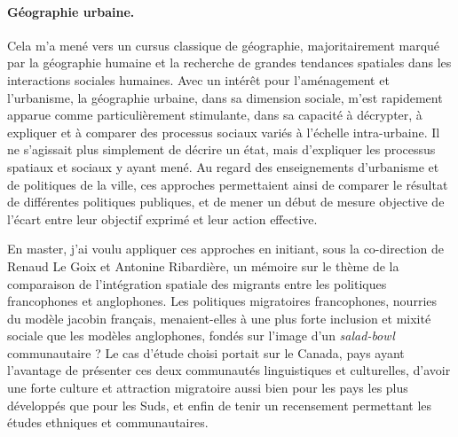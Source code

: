 \paragraph{Géographie urbaine.}
Cela m'a mené vers un cursus classique de géographie, majoritairement marqué par la géographie humaine et la recherche de grandes tendances spatiales dans les interactions sociales humaines.
Avec un intérêt pour l'aménagement et l'urbanisme, la géographie urbaine, dans sa dimension sociale, m'est rapidement apparue comme particulièrement stimulante, dans sa capacité à décrypter, à expliquer et à comparer des processus sociaux variés à l'échelle intra-urbaine.
Il ne s'agissait plus simplement de décrire un état, mais d'expliquer les processus spatiaux et sociaux y ayant mené.
Au regard des enseignements d'urbanisme et de politiques de la ville, ces approches permettaient ainsi de comparer le résultat de différentes politiques publiques, et de mener un début de mesure objective de l'écart entre leur objectif exprimé et leur action effective.

En master, j'ai voulu appliquer ces approches en initiant, sous la co-direction de Renaud Le Goix et Antonine Ribardière, un mémoire sur le thème de la comparaison de l'intégration spatiale des migrants entre les politiques francophones et anglophones.
Les politiques migratoires francophones, nourries du modèle jacobin français, menaient-elles à une plus forte inclusion et mixité sociale que les modèles anglophones, fondés sur l'image d'un \og \textit{salad-bowl}\fg{} communautaire ?
Le cas d'étude choisi portait sur le Canada, pays ayant l'avantage de présenter ces deux communautés linguistiques et culturelles, d'avoir une forte culture et attraction migratoire aussi bien pour les pays les plus développés que pour les Suds, et enfin de tenir un recensement permettant les études ethniques et communautaires.

